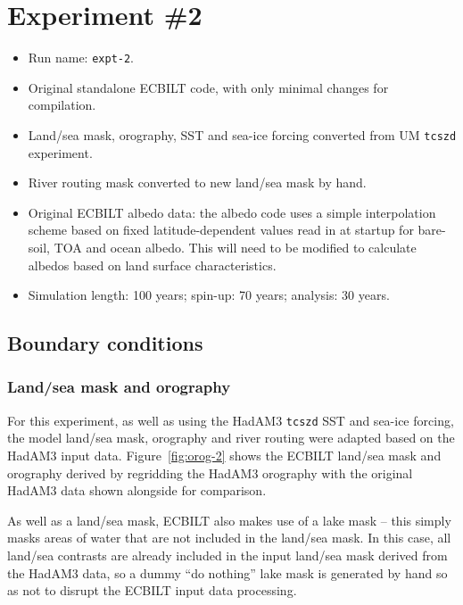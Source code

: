 \documentclass[a4paper,11pt]{article}
\begin{document}
\section{Experiment \#2}

\begin{itemize}
  \item{Run name: \texttt{expt-2}.}
  \item{Original standalone ECBILT code, with only minimal changes for
    compilation.}
  \item{Land/sea mask, orography, SST and sea-ice forcing converted
    from UM \texttt{tcszd} experiment.}
  \item{River routing mask converted to new land/sea mask by hand.}
  \item{Original ECBILT albedo data: the albedo code uses a simple
    interpolation scheme based on fixed latitude-dependent values read
    in at startup for bare-soil, TOA and ocean albedo.  This will need
    to be modified to calculate albedos based on land surface
    characteristics.}
  \item{Simulation length: 100 years; spin-up: 70 years; analysis: 30
    years.}
\end{itemize}

\subsection{Boundary conditions}

\subsubsection{Land/sea mask and orography}

For this experiment, as well as using the HadAM3 \texttt{tcszd} SST
and sea-ice forcing, the model land/sea mask, orography and river
routing were adapted based on the HadAM3 input data.
Figure~\ref{fig:orog-2} shows the ECBILT land/sea mask and orography
derived by regridding the HadAM3 orography with the original HadAM3
data shown alongside for comparison.

As well as a land/sea mask, ECBILT also makes use of a lake mask --
this simply masks areas of water that are not included in the land/sea
mask.  In this case, all land/sea contrasts are already included in
the input land/sea mask derived from the HadAM3 data, so a dummy ``do
nothing'' lake mask is generated by hand so as not to disrupt the
ECBILT input data processing.
\end{document}
